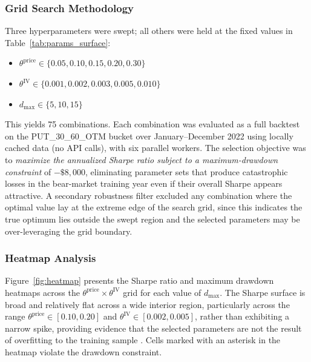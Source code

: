 \documentclass[10pt,twocolumn]{article}
\begin{document}
\subsubsection{Grid Search Methodology}

Three hyperparameters were swept; all others were held at the fixed values
in Table~\ref{tab:params_surface}:

\begin{itemize}[noitemsep]
  \item $\theta^{\text{price}} \in \{0.05, 0.10, 0.15, 0.20, 0.30\}$
  \item $\theta^{\text{IV}} \in \{0.001, 0.002, 0.003, 0.005, 0.010\}$
  \item $d_{\text{max}} \in \{5, 10, 15\}$
\end{itemize}

This yields 75 combinations.  Each combination was evaluated as a full
backtest on the PUT\_30\_60\_OTM bucket over January--December 2022 using
locally cached data (no API calls), with six parallel workers.  The
selection objective was to \emph{maximize the annualized Sharpe ratio
subject to a maximum-drawdown constraint} of $-\$8{,}000$, eliminating
parameter sets that produce catastrophic losses in the bear-market training
year even if their overall Sharpe appears attractive.  A secondary
robustness filter excluded any combination where the optimal value lay at
the extreme edge of the search grid, since this indicates the true optimum
lies outside the swept region and the selected parameters may be
over-leveraging the grid boundary.

\subsubsection{Heatmap Analysis}

Figure~\ref{fig:heatmap} presents the Sharpe ratio and maximum drawdown
heatmaps across the $\theta^{\text{price}} \times \theta^{\text{IV}}$ grid
for each value of $d_{\text{max}}$.  The Sharpe surface is broad and
relatively flat across a wide interior region, particularly across the range
$\theta^{\text{price}} \in [0.10, 0.20]$ and $\theta^{\text{IV}} \in
[0.002, 0.005]$, rather than exhibiting a narrow spike, providing
evidence that the selected parameters are not the result of overfitting to
the training sample \cite{bailey2014}.  Cells marked with an asterisk in the
heatmap violate the drawdown constraint.
\end{document}
